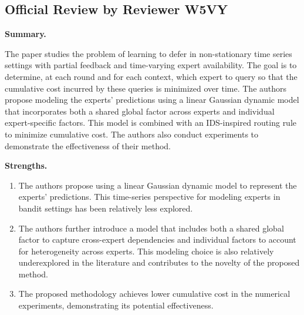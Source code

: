 \subsection*{Official Review by Reviewer W5VY}

\textbf{Summary.}

The paper studies the problem of learning to defer in non-stationary time series settings with partial feedback and time-varying expert availability. The goal is to determine, at each round and for each context, which expert to query so that the cumulative cost incurred by these queries is minimized over time. The authors propose modeling the experts' predictions using a linear Gaussian dynamic model that incorporates both a shared global factor across experts and individual expert-specific factors. This model is combined with an IDS-inspired routing rule to minimize cumulative cost. The authors also conduct experiments to demonstrate the effectiveness of their method.

\textbf{Strengths.}
\begin{enumerate}
    \item The authors propose using a linear Gaussian dynamic model to represent the experts' predictions. This time-series perspective for modeling experts in bandit settings has been relatively less explored.
    \item The authors further introduce a model that includes both a shared global factor to capture cross-expert dependencies and individual factors to account for heterogeneity across experts. This modeling choice is also relatively underexplored in the literature and contributes to the novelty of the proposed method.
    \item The proposed methodology achieves lower cumulative cost in the numerical experiments, demonstrating its potential effectiveness.
\end{enumerate}

